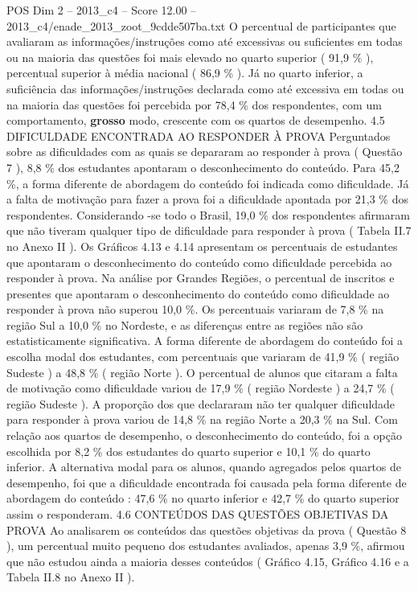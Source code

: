 \begin{textsample}{POS Dim 2 – 2013\_c4 – Score 12.00 – 2013\_c4/enade\_2013\_zoot\_9cdde507ba.txt}
O percentual de participantes que avaliaram as informações/instruções como até excessivas ou suficientes em todas ou na maioria das questões foi mais elevado no quarto superior ( 91,9 \% ), percentual superior à média nacional ( 86,9 \% ).
Já no quarto inferior, a suficiência das informações/instruções declarada como até excessiva em todas ou na maioria das questões foi percebida por 78,4 \% dos respondentes, com um comportamento, \textbf{grosso} modo, crescente com os quartos de desempenho. 4.5 DIFICULDADE ENCONTRADA AO RESPONDER À PROVA Perguntados sobre as dificuldades com as quais se depararam ao responder à prova ( Questão 7 ), 8,8 \% dos estudantes apontaram o desconhecimento do conteúdo.
Para 45,2 \%, a forma diferente de abordagem do conteúdo foi indicada como dificuldade.
Já a falta de motivação para fazer a prova foi a dificuldade apontada por 21,3 \% dos respondentes.
Considerando -se todo o Brasil, 19,0 \% dos respondentes afirmaram que não tiveram qualquer tipo de dificuldade para responder à prova ( Tabela II.7 no Anexo II ).
Os Gráficos 4.13 e 4.14 apresentam os percentuais de estudantes que apontaram o desconhecimento do conteúdo como dificuldade percebida ao responder à prova.
Na análise por Grandes Regiões, o percentual de inscritos e presentes que apontaram o desconhecimento do conteúdo como dificuldade ao responder à prova não superou 10,0 \%.
Os percentuais variaram de 7,8 \% na região Sul a 10,0 \% no Nordeste, e as diferenças entre as regiões não são estatisticamente significativa.
A forma diferente de abordagem do conteúdo foi a escolha modal dos estudantes, com percentuais que variaram de 41,9 \% ( região Sudeste ) a 48,8 \% ( região Norte ).
O percentual de alunos que citaram a falta de motivação como dificuldade variou de 17,9 \% ( região Nordeste ) a 24,7 \% ( região Sudeste ).
A proporção dos que declararam não ter qualquer dificuldade para responder à prova variou de 14,8 \% na região Norte a 20,3 \% na Sul.
Com relação aos quartos de desempenho, o desconhecimento do conteúdo, foi a opção escolhida por 8,2 \% dos estudantes do quarto superior e 10,1 \% do quarto inferior.
A alternativa modal para os alunos, quando agregados pelos quartos de desempenho, foi que a dificuldade encontrada foi causada pela forma diferente de abordagem do conteúdo : 47,6 \% no quarto inferior e 42,7 \% do quarto superior assim o responderam. 4.6 CONTEÚDOS DAS QUESTÕES OBJETIVAS DA PROVA Ao analisarem os conteúdos das questões objetivas da prova ( Questão 8 ), um percentual muito pequeno dos estudantes avaliados, apenas 3,9 \%, afirmou que não estudou ainda a maioria desses conteúdos ( Gráfico 4.15, Gráfico 4.16 e a Tabela II.8 no Anexo II ).

\end{textsample}

